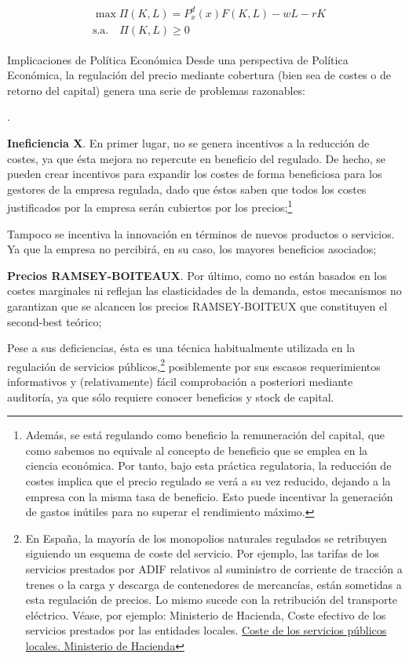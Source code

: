 \documentclass[10pt,a4paper]{article}
\newcounter{numitem}
\newenvironment{lnum}
      {\begin{list}{\arabic{numitem}.}{%
          \usecounter{numitem}%
          \setlength{\leftmargin}{1cm}%
          \setlength{\parskip}{3pt}%
          \setlength{\itemsep}{0pt}%
          \setlength{\parsep}{0pt}%
      }}
      {\end{list}}
\begin{document}
$$\begin{aligned}
    \boxed{\begin{aligned}
        &\max \Pi(K,L)=P_x^d(x)F(K,L)-wL-rK\\[0.5em]
        &\text{s.a.}\quad \Pi(K,L)\ge 0
    \end{aligned}}
\end{aligned}$$


{Implicaciones de Política Económica}
Desde una perspectiva de Política Económica, la regulación del precio mediante cobertura (bien sea de costes o de retorno del capital) genera una serie de problemas razonables:
\begin{lnum}
    \item \textbf{Ineficiencia X}. En primer lugar, no se genera incentivos a la reducción de costes, ya que ésta mejora no repercute en beneficio del regulado. De hecho, se pueden crear incentivos para expandir los costes de forma beneficiosa para los gestores de la empresa regulada, dado que éstos saben que todos los costes justificados por la empresa serán cubiertos por los precios;\footnote{%
        Además, se está regulando como beneficio la remuneración del capital, que como sabemos no equivale al concepto de beneficio que se emplea en la ciencia económica. Por tanto, bajo esta práctica regulatoria, la reducción de costes implica que el precio regulado se verá a su vez reducido, dejando a la empresa con la misma tasa de beneficio. Esto puede incentivar la generación de gastos inútiles para no superar el rendimiento máximo.
    }
    \item Tampoco se incentiva la innovación en términos de nuevos productos o servicios. Ya que la empresa no percibirá, en su caso, los mayores beneficios asociados;
    \item \textbf{Precios RAMSEY-BOITEAUX}. Por último, como no están basados en los costes marginales ni reflejan las elasticidades de la demanda, estos mecanismos no garantizan que se alcancen los precios RAMSEY-BOITEUX que constituyen el second-best teórico;
\end{lnum}

Pese a sus deficiencias, ésta es una técnica habitualmente utilizada en la regulación de servicios públicos,\footnote{%
    En España, la mayoría de los monopolios naturales regulados se retribuyen siguiendo un esquema de coste del servicio. Por ejemplo, las tarifas de los servicios prestados por ADIF relativos al suministro de corriente de tracción a trenes o la carga y descarga de contenedores de mercancías, están sometidas a esta regulación de precios. Lo mismo sucede con la retribución del transporte eléctrico. Véase, por ejemplo: Ministerio de Hacienda, Coste efectivo de los servicios prestados por las entidades locales. \href{https://www.hacienda.gob.es/es-ES/CDI/Paginas/InformacionPresupuestaria/InformacionEELLs/CosteServicios.aspx}{Coste de los servicios públicos locales. Ministerio de Hacienda}
} posiblemente por sus escasos requerimientos informativos y (relativamente) fácil comprobación a posteriori mediante auditoría, ya que sólo requiere conocer beneficios y stock de capital.
\end{document}
